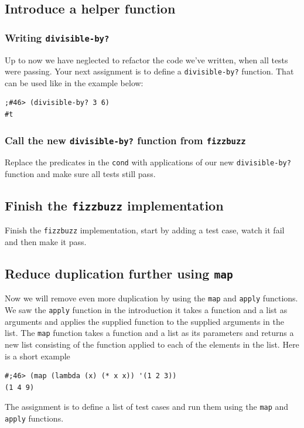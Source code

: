 \documentclass[12pt,a4paper,english,twoside]{article}
\begin{document}
\subsection{Introduce a helper function}
\subsubsection{Writing \texttt{divisible-by?}}
Up to now we have neglected to refactor the code 
we've written, when all tests were passing. Your next assignment is to define 
a \texttt{divisible-by?} function. That can be used like in the example below:
\begin{lstlisting}
;#46> (divisible-by? 3 6)
#t
\end{lstlisting}
\subsubsection{Call the new \texttt{divisible-by?} function from 
\texttt{fizzbuzz}}
Replace the predicates in the \texttt{cond} with applications of our new 
\texttt{divisible-by?} function and make sure all tests still pass.
\subsection{Finish the \texttt{fizzbuzz} implementation}
Finish the \texttt{fizzbuzz} implementation, start by adding a test case, 
watch it fail and then make it pass. 
\subsection{Reduce duplication further using \texttt{map}}
Now we will remove even more duplication by using the \texttt{map} and 
\texttt{apply} functions. We saw the \texttt{apply} function in the 
introduction it takes a function and a list as arguments and applies the 
supplied function to the supplied arguments in the list. The \texttt{map} 
function takes a function and a list as its parameters and returns a new list 
consisting of the function applied to each of the elements in the list.
Here is a short example
\begin{lstlisting}
#;46> (map (lambda (x) (* x x)) '(1 2 3))
(1 4 9)
\end{lstlisting}
The assignment is to define a list of test cases and run them using the 
\texttt{map} and \texttt{apply} functions.
\end{document}
